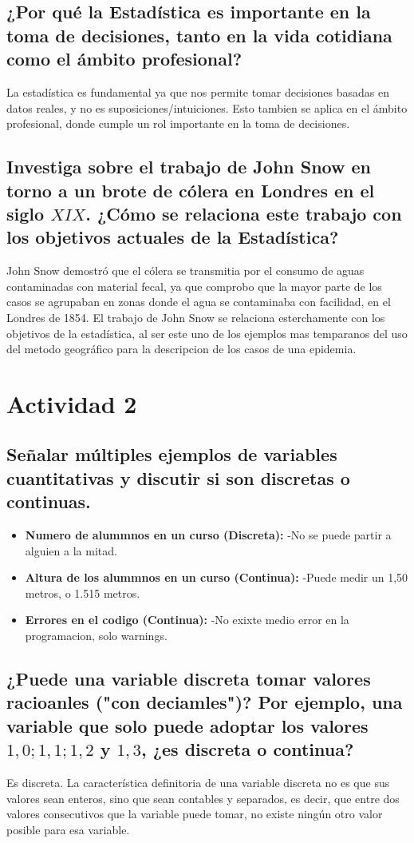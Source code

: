 \documentclass[12pt, letterpaper]{article}
\begin{document}
\subsection{¿Por qué la Estadística es importante en la toma de decisiones, tanto en la vida cotidiana como el ámbito profesional?}
La estadística es fundamental ya que nos permite tomar decisiones basadas en datos reales, y no es suposiciones/intuiciones. Esto tambien se aplica en el ámbito profesional, donde cumple un rol importante en la toma de decisiones.

\subsection{Investiga sobre el trabajo de John Snow en torno a un brote de cólera en Londres en el siglo \textit{$XIX$}. ¿Cómo se relaciona este trabajo con los objetivos actuales de la Estadística?}
John Snow demostró que el cólera se transmitia por el consumo de aguas contaminadas con material fecal, ya que comprobo que la mayor parte de los casos se agrupaban en zonas donde el agua se contaminaba con facilidad, en el Londres de 1854. El trabajo de John Snow se relaciona esterchamente con los objetivos de la estadística, al ser este uno de los ejemplos mas temparanos del uso del metodo geográfico para la descripcion de los casos de una epidemia.

\section{Actividad 2}
\subsection{Señalar múltiples ejemplos de variables cuantitativas y discutir si son discretas o continuas.}
\begin{itemize}
    \item \textbf{Numero de alummnos en un curso (Discreta):} -No se puede partir a alguien a la mitad.
    \item \textbf{Altura de los alummnos en un curso (Continua):} -Puede medir un 1,50 metros, o 1.515 metros. 
    \item \textbf{Errores en el codigo (Continua):} -No exixte medio error en la programacion, solo warnings.
\end{itemize}


\subsection{¿Puede una variable discreta tomar valores racioanles ("con deciamles")? Por ejemplo, una variable que solo puede adoptar los valores $1,0; 1,1; 1,2$ y $1,3$, ¿es discreta o continua?}
Es discreta. La característica definitoria de una variable discreta no es que sus valores sean enteros, sino que sean contables y separados, es decir, que entre dos valores consecutivos que la variable puede tomar, no existe ningún otro valor posible para esa variable.
\end{document}
